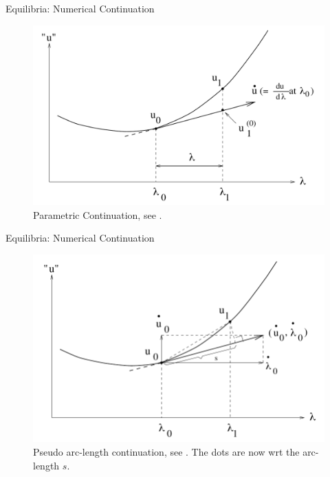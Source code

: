 \documentclass{beamer}
\begin{document}

\begin{frame}{Equilibria: Numerical Continuation}
\begin{figure}[ht]
  \centering
  \includegraphics[scale=0.3]
  {Figs/continuation.png}  
  \caption{Parametric Continuation, see \cite{doedel2007lecture}.}
  \label{fig:continuation}
\end{figure}
\end{frame}
\begin{frame}{Equilibria: Numerical Continuation}
\begin{figure}[ht]
  \centering
  \includegraphics[scale = 0.4]
  {Figs/pseudo_arclength_continuation.png}  
  \caption{Pseudo arc-length continuation, see \cite{doedel2007lecture}. The dots are now wrt the arc-length $s$.}
  \label{fig:pseudo_arclength_continuation}
\end{figure}
\end{frame}
\end{document}
